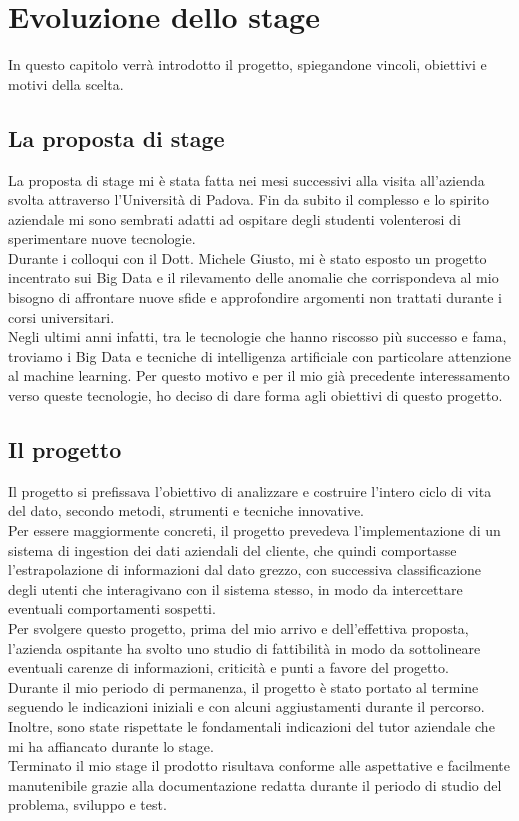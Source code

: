 
\chapter{Evoluzione dello stage}
In questo capitolo verrà introdotto il progetto, spiegandone vincoli, obiettivi e motivi della scelta.
\section{La proposta di stage}
La proposta di stage mi è stata fatta nei mesi successivi alla visita all'azienda svolta attraverso l'Università di Padova. Fin da subito il complesso e lo spirito aziendale mi sono sembrati adatti ad ospitare degli studenti volenterosi di sperimentare nuove tecnologie.
\\
Durante i colloqui con il Dott. Michele Giusto, mi è stato esposto un progetto incentrato sui Big Data e il rilevamento delle anomalie che corrispondeva al mio bisogno di affrontare nuove sfide e approfondire argomenti non trattati durante i corsi universitari.
\\
Negli ultimi anni infatti, tra le tecnologie che hanno riscosso più successo e fama, troviamo i Big Data e tecniche di intelligenza artificiale con particolare attenzione al machine learning.
Per questo motivo e per il mio già precedente interessamento verso queste tecnologie, ho deciso di dare forma agli obiettivi di questo progetto. 

\section{Il progetto}
Il progetto si prefissava l'obiettivo di analizzare e costruire l'intero ciclo di vita del dato, secondo metodi, strumenti e tecniche innovative.
\\
Per essere maggiormente concreti, il progetto prevedeva l'implementazione di un sistema di \gls{ingestion} dei dati aziendali del cliente, che quindi comportasse l'estrapolazione di informazioni dal dato grezzo, con successiva classificazione degli utenti che interagivano con il sistema stesso, in modo da intercettare eventuali comportamenti sospetti.
\\
Per svolgere questo progetto, prima del mio arrivo e dell'effettiva proposta, l'azienda ospitante ha svolto uno studio di fattibilità in modo da sottolineare eventuali carenze di informazioni, criticità e punti a favore del progetto.
\\
Durante il mio periodo di permanenza, il progetto è stato portato al termine seguendo le indicazioni iniziali e con alcuni aggiustamenti durante il percorso. Inoltre, sono state rispettate le fondamentali indicazioni del tutor aziendale che mi ha affiancato durante lo stage.
\\
Terminato il mio stage il prodotto risultava conforme alle aspettative e facilmente manutenibile grazie alla documentazione redatta durante il periodo di studio del problema, sviluppo e test.
